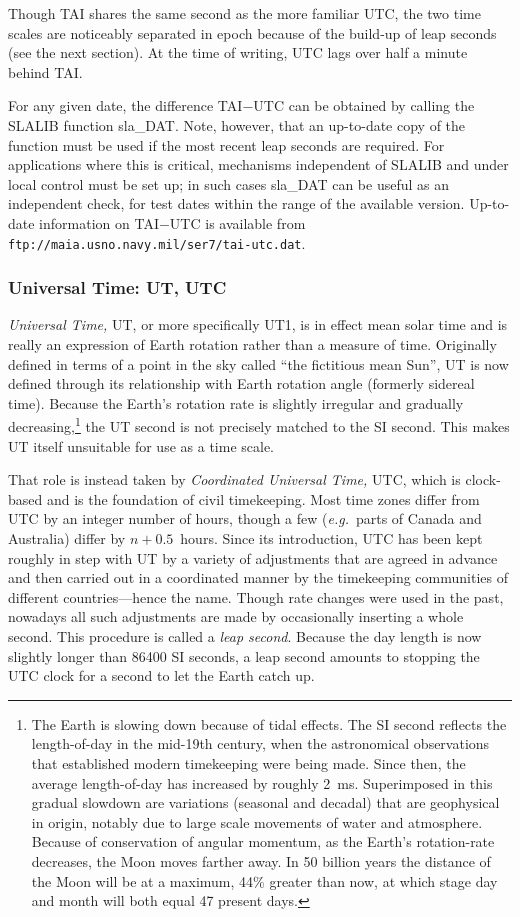 \documentclass[11pt,twoside]{article}
\begin{document}
Though TAI shares the same second as the more familiar UTC, the
two time scales are noticeably separated in epoch because of the
build-up of leap seconds (see the next section).
At the time of writing, UTC
lags over half a minute behind TAI.

For any given date, the difference TAI$-$UTC
can be obtained by calling the SLALIB function
sla\_DAT.
Note, however, that an up-to-date copy of the function must be used if
the most recent leap seconds are required.  For applications
where this is critical, mechanisms independent of SLALIB
and under local control must
be set up;  in such cases
sla\_DAT
can be useful as an
independent check, for test dates within the range of the
available version.  Up-to-date information on TAI$-$UTC is available
from {\tt ftp://maia.usno.navy.mil/ser7/tai-utc.dat}.

\subsubsection{Universal Time: UT, UTC}
\label{UTC}
{\it Universal Time,} UT, or more specifically UT1,
is in effect mean solar time and is really an expression
of Earth rotation rather than a measure of time.
Originally
defined in terms of a point in the sky called ``the fictitious
mean Sun'', UT is now defined through its relationship
with Earth rotation angle
(formerly sidereal time).
Because the Earth's rotation rate is slightly irregular and
gradually decreasing,\footnote{The Earth is slowing
down because of tidal effects.  The SI
second reflects the length-of-day in the mid-19th century, when
the astronomical observations that established modern timekeeping
were being made.  Since then,
the average length-of-day has increased by roughly 2~ms.
Superimposed in this gradual slowdown are
variations (seasonal and decadal) that are geophysical in origin,
notably due to large scale movements of water and atmosphere.
Because of
conservation of angular momentum, as the Earth's rotation-rate
decreases, the Moon moves farther away.  In 50 billion years the
distance of the Moon will be at a maximum, 44\% greater than now, at
which stage day and month will both equal 47 present days.}
the UT second is not precisely
matched to the SI second.  This makes UT itself unsuitable for
use as a time scale.

That role is instead taken by
{\it Coordinated Universal Time,} UTC, which is clock-based and
is the foundation of civil timekeeping.
Most time zones differ from UTC by an integer number
of hours, though a few ({\it e.g.}\ parts of Canada and Australia) differ
by $n+0.5$~hours.  Since its introduction, UTC has been kept
roughly in step with UT by a variety of adjustments that are
agreed in advance and then carried out in a coordinated manner by
the timekeeping communities of different countries---hence the
name.  Though rate
changes were used in the past, nowadays all such adjustments
are made by occasionally inserting
a whole second.  This procedure is called
a {\it leap second}.  Because the day length is now slightly longer
than 86400 SI seconds, a leap second amounts to stopping the UTC
clock for a second to let the Earth catch up.
\end{document}
